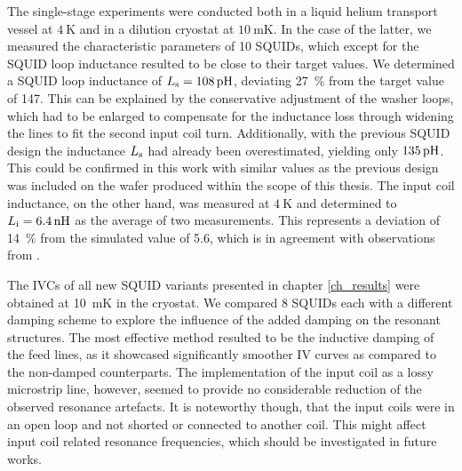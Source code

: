 The single-stage experiments were conducted both in a liquid helium transport vessel at $\qty{4}{\kelvin}$ and in a dilution cryostat at $\qty{10}{\milli\kelvin}$. In the case of the latter, we measured the characteristic parameters of 10 SQUIDs, which except for the SQUID loop inductance resulted to be close to their target values. 
We determined a SQUID loop inductance of $L_{\rm s}=\qty{108}{\pH}$, deviating \qty{27}{\percent} from the target value of \qty{147}{\pH}. This can be explained by the conservative adjustment of the washer loops, which had to be enlarged to compensate for the inductance loss through widening the lines to fit the second input coil turn. Additionally, with the previous SQUID design the inductance $L_{\rm s}$ had already been overestimated, yielding only $\qty{135}{\pH}$. This could be confirmed in this work with similar values as the previous design was included on the wafer produced within the scope of this thesis. The input coil inductance, on the other hand, was measured at $\qty{4}{\kelvin}$ and determined to $L_{\rm i}=\qty{6.4}{\nH}$ as the average of two measurements. This represents a deviation of \qty{14}{\percent} from the simulated value of \qty{5.6}{\nH}, which is in agreement with observations from \cite{Ferring2015, Bauer2022}. 

The IVCs of all new SQUID variants presented in chapter \ref{ch_results} were obtained at \qty{10}{\milli\kelvin} in the cryostat. We compared 8 SQUIDs each with a different damping scheme to explore the influence of the added damping on the resonant structures. The most effective method resulted to be the inductive damping of the feed lines, as it showcased significantly smoother IV curves as compared to the non-damped counterparts. The implementation of the input coil as a lossy microstrip line, however, seemed to provide no considerable reduction of the observed resonance artefacts. It is noteworthy though, that the input coils were in an open loop and not shorted or connected to another coil. This might affect input coil related resonance frequencies, which should be investigated in future works. 

